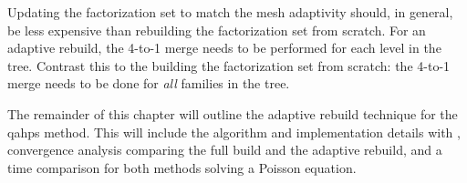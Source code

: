 Updating the factorization set to match the mesh adaptivity should, in general, be less expensive than rebuilding the factorization set from scratch. For an adaptive rebuild, the 4-to-1 merge needs to be performed for each level in the tree. Contrast this to the building the factorization set from scratch: the 4-to-1 merge needs to be done for {\em all} families in the tree.

The remainder of this chapter will outline the adaptive rebuild technique for the \gls{qahps} method. This will include the algorithm and implementation details with \pforest, convergence analysis comparing the full build and the adaptive rebuild, and a time comparison for both methods solving a Poisson equation.
